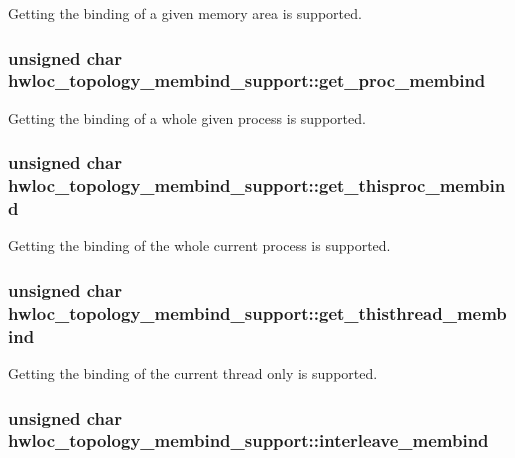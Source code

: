 \label{a00025_a0a84e24a06f2fa487fe8c9605c6f68b3}
Getting the binding of a given memory area is supported. \hypertarget{a00025_a9880cd2d605e316fc020167c49ca69ad}{
\subsubsection[{get\_\-proc\_\-membind}]{\setlength{\rightskip}{0pt plus 5cm}unsigned char {\bf hwloc\_\-topology\_\-membind\_\-support::get\_\-proc\_\-membind}}}
\label{a00025_a9880cd2d605e316fc020167c49ca69ad}
Getting the binding of a whole given process is supported. \hypertarget{a00025_a3fd51e6fa5f0dd800322301b46b08559}{
\subsubsection[{get\_\-thisproc\_\-membind}]{\setlength{\rightskip}{0pt plus 5cm}unsigned char {\bf hwloc\_\-topology\_\-membind\_\-support::get\_\-thisproc\_\-membind}}}
\label{a00025_a3fd51e6fa5f0dd800322301b46b08559}
Getting the binding of the whole current process is supported. \hypertarget{a00025_a63b0b2e26157b472f5717ee93cc7c535}{
\subsubsection[{get\_\-thisthread\_\-membind}]{\setlength{\rightskip}{0pt plus 5cm}unsigned char {\bf hwloc\_\-topology\_\-membind\_\-support::get\_\-thisthread\_\-membind}}}
\label{a00025_a63b0b2e26157b472f5717ee93cc7c535}
Getting the binding of the current thread only is supported. \hypertarget{a00025_a3c44c6012860bbeba8a0f4c19710858d}{
\subsubsection[{interleave\_\-membind}]{\setlength{\rightskip}{0pt plus 5cm}unsigned char {\bf hwloc\_\-topology\_\-membind\_\-support::interleave\_\-membind}}}
